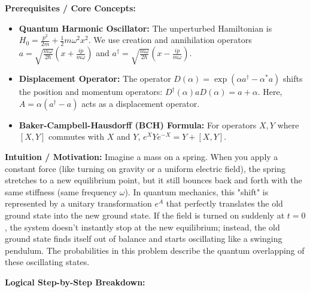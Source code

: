 \begin{solution}
\textbf{Prerequisites / Core Concepts:}
\begin{itemize}
    \item \textbf{Quantum Harmonic Oscillator:} The unperturbed Hamiltonian is $H_0 = \frac{p^2}{2m} + \frac{1}{2}m\omega^2 x^2$. We use creation and annihilation operators $a = \sqrt{\frac{m\omega}{2\hbar}} \left( x + \frac{i p}{m\omega} \right)$ and $a^\dagger = \sqrt{\frac{m\omega}{2\hbar}} \left( x - \frac{i p}{m\omega} \right)$.
    \item \textbf{Displacement Operator:} The operator $D(\alpha) = \exp(\alpha a^\dagger - \alpha^* a)$ shifts the position and momentum operators: $D^\dagger(\alpha) a D(\alpha) = a + \alpha$. Here, $A = \alpha(a^\dagger - a)$ acts as a displacement operator.
    \item \textbf{Baker-Campbell-Hausdorff (BCH) Formula:} For operators $X, Y$ where $[X, Y]$ commutes with $X$ and $Y$, $e^X Y e^{-X} = Y + [X, Y]$.
\end{itemize}

\textbf{Intuition / Motivation:}
Imagine a mass on a spring. When you apply a constant force (like turning on gravity or a uniform electric field), the spring stretches to a new equilibrium point, but it still bounces back and forth with the same stiffness (same frequency $\omega$). In quantum mechanics, this "shift" is represented by a unitary transformation $e^A$ that perfectly translates the old ground state into the new ground state. If the field is turned on suddenly at $t=0$, the system doesn't instantly stop at the new equilibrium; instead, the old ground state finds itself out of balance and starts oscillating like a swinging pendulum. The probabilities in this problem describe the quantum overlapping of these oscillating states.

\textbf{Logical Step-by-Step Breakdown:}


\end{solution}
